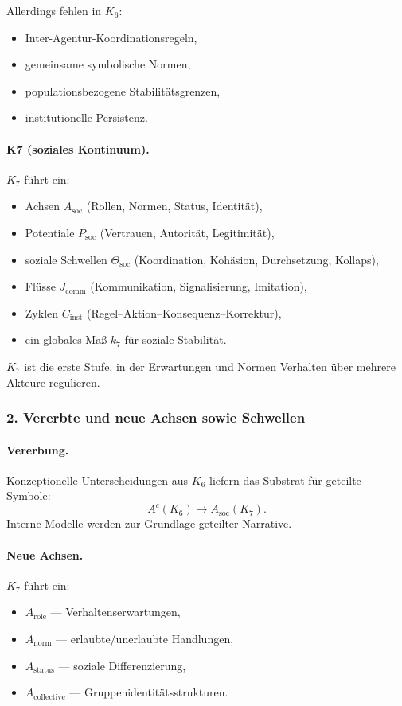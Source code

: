 Allerdings fehlen in $K_6$:
\begin{itemize}
  \item Inter-Agentur-Koordinationsregeln,
  \item gemeinsame symbolische Normen,
  \item populationsbezogene Stabilitätsgrenzen,
  \item institutionelle Persistenz.
\end{itemize}

\paragraph{K7 (soziales Kontinuum).}
$K_7$ führt ein:
\begin{itemize}
  \item Achsen $A_{\mathrm{soc}}$ (Rollen, Normen, Status, Identität),
  \item Potentiale $P_{\mathrm{soc}}$ (Vertrauen, Autorität, Legitimität),
  \item soziale Schwellen $\Theta_{\mathrm{soc}}$ (Koordination, Kohäsion,
        Durchsetzung, Kollaps),
  \item Flüsse $J_{\mathrm{comm}}$ (Kommunikation, Signalisierung, Imitation),
  \item Zyklen $C_{\mathrm{inst}}$ (Regel–Aktion–Konsequenz–Korrektur),
  \item ein globales Maß $k_7$ für soziale Stabilität.
\end{itemize}

$K_7$ ist die erste Stufe, in der Erwartungen und Normen Verhalten über mehrere
Akteure regulieren.

\subsubsection{2. Vererbte und neue Achsen sowie Schwellen}

\paragraph{Vererbung.}
Konzeptionelle Unterscheidungen aus $K_6$ liefern das Substrat für geteilte Symbole:
\[
A^{c}(K_6) \rightarrow A_{\mathrm{soc}}(K_7).
\]
Interne Modelle werden zur Grundlage geteilter Narrative.

\paragraph{Neue Achsen.}
$K_7$ führt ein:
\begin{itemize}
  \item $A_{\mathrm{role}}$ — Verhaltenserwartungen,
  \item $A_{\mathrm{norm}}$ — erlaubte/unerlaubte Handlungen,
  \item $A_{\mathrm{status}}$ — soziale Differenzierung,
  \item $A_{\mathrm{collective}}$ — Gruppenidentitätsstrukturen.
\end{itemize}

